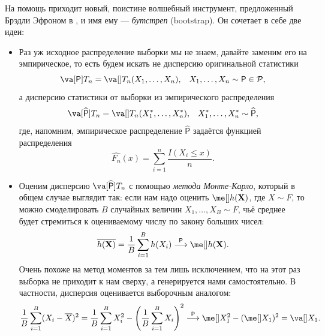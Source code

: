На помощь приходит новый, поистине волшебный инструмент, предложенный Брэдли Эфроном в \cite{efron1979bootstrap}, и имя ему --- \textit{бутстреп} (\textsf{bootstrap}). Он сочетает в себе две идеи:
\begin{itemize}
    \item Раз уж исходное распределение выборки мы не знаем, давайте заменим его на эмпирическое, то есть будем искать не дисперсию оригинальной статистики
    $$\va[\mathsf{P}] T_n = \va[] T_n(X_1, \ldots, X_n),\;\;\;X_1, \ldots, X_n \sim \mathsf{P} \in \mathcal{P},$$
    а дисперсию статистики от выборки из эмпирического распределения
    $$\va[\widehat{\mathsf{P}}] T_n = \va[] T_n(X_1^*, \ldots, X_n^*),\;\;\;X_1^*, \ldots, X_n^* \sim \widehat {\mathsf{P}},$$
    где, напомним, эмпирическое распределение $\widehat {\mathsf{P}}$ задаётся функцией распределения
    \[
    \widehat{F_n}(x) = \sum_{i=1}^n \frac{I(X_{i} \le x)}{n}.
    \]
    \item Оценим дисперсию $\va[\widehat{\mathsf{P}}] T_n$ с помощью \textit{метода Монте-Карло}, который в общем случае выглядит так: если нам надо оценить $\me[] h(\mathbf X)$, где $X \sim F$, то можно смоделировать $B$ случайных величин $X_1, \ldots, X_B \sim F$, чьё среднее будет стремиться к оцениваемому числу по закону больших чисел:
    \[
    \overline{h(\mathbf X)} = \frac{1}{B} \sum_{i=1}^B h(X_i) \stackrel{\mathsf{P}}{\longrightarrow} \me[] h(\mathbf X).
    \]
    Очень похоже на метод моментов за тем лишь исключением, что на этот раз выборка не приходит к нам сверху, а генерируется нами самостоятельно. В частности, дисперсия оценивается выборочным аналогом:
    \[
    \frac{1}{B} \sum_{i=1}^B (X_i - \overline{X})^2 = \frac{1}{B} \sum_{i=1}^B X_i^2 - \left(\frac{1}{B}\sum_{i=1}^B X_i\right)^2 \stackrel{\mathsf{P}}{\longrightarrow} \me[] X_1^2 - (\me[] X_1)^2 = \va[] X_1. 
    \]
\end{itemize}

